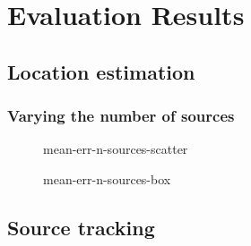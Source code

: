 \chapter{Evaluation Results}
\label{chap:results}

\section{Location estimation}
\subsection*{Varying the number of sources}

\begin{figure}[H]
	\centering
	\begin{subfigure}{0.50\textwidth}
			
	\end{subfigure}
	\begin{subfigure}{0.35\textwidth}
			
	\end{subfigure}
	\label{Mean localisation error across number of sources}
\end{figure}

\begin{figure}[H]
	\centering
	{mean-err-n-sources-scatter}
	\label{Mean localisation error across number of sources}
\end{figure}

\begin{figure}[H]
	\centering
	{mean-err-n-sources-box}
	\label{Mean localisation error across number of sources}
\end{figure}






\section{Source tracking}